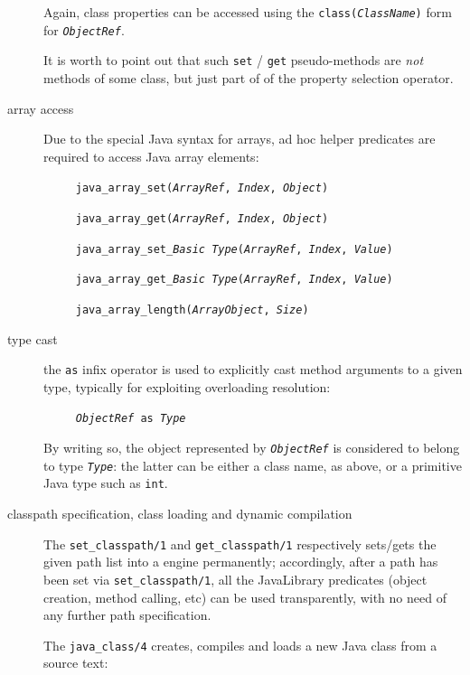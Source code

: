 \begin{description}
        Again, class properties can be accessed using the  \texttt{class(\textit{ClassName})} form for  \texttt{\textit{ObjectRef}}.

        It is worth to point out that such \texttt{set} / \texttt{get}
        pseudo-methods are \textit{not} methods of some class, but just
        part of of the property selection operator.

  \item [array access]
        Due to the special Java syntax for arrays, ad hoc helper predicates are required to access Java array elements:

        \texttt{~~~~~java\_array\_set(\textit{ArrayRef}, \textit{Index}, \textit{Object})}

        \texttt{~~~~~java\_array\_get(\textit{ArrayRef}, \textit{Index}, \textit{Object})}

        \texttt{~~~~~java\_array\_set\_\textit{\emph{Basic Type}}(\textit{ArrayRef}, \textit{Index}, \textit{Value})}

        \texttt{~~~~~java\_array\_get\_\textit{\emph{Basic Type}}(\textit{ArrayRef}, \textit{Index}, \textit{Value})}

        \texttt{~~~~~java\_array\_length(\textit{ArrayObject}, \textit{Size})}

  \item [type cast]
        the \texttt{as} infix operator is used to explicitly cast method arguments to a given type, typically for exploiting overloading resolution:

        \texttt{~~~~~\textit{ObjectRef} as \textit{Type}}

        By writing so, the object represented by \texttt{\textit{ObjectRef}} is considered to belong to type \texttt{\textit{Type}}: the latter can be either a class name, as above, or a primitive Java type such as \texttt{int}.

  \item [classpath specification, class loading and dynamic compilation]

        The \texttt{set\_classpath/1} and \texttt{get\_classpath/1} respectively sets/gets the given path list into a \tuprolog{} engine permanently; accordingly, after a path has been set via \texttt{set\_classpath/1}, all the JavaLibrary predicates (object creation, method calling, etc) can be used transparently, with no need of any further path specification.

        The \texttt{java\_class/4} creates, compiles and loads a new Java class from a source text:


\end{description}
